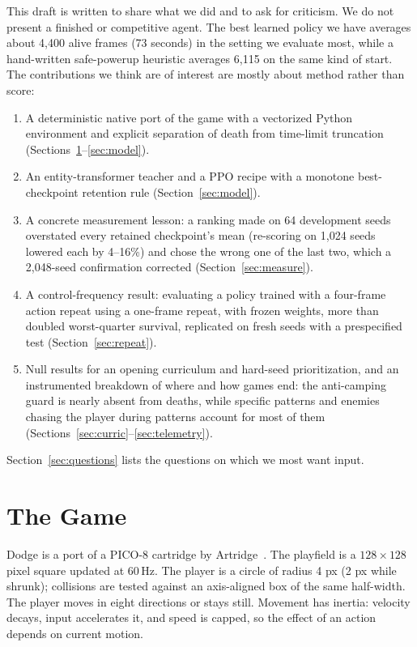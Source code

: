 \documentclass[journal]{IEEEtran}
\begin{document}
This draft is written to share what we did and to ask for criticism. We do not present a finished or competitive agent. The best learned policy we have averages about 4{,}400 alive frames (73 seconds) in the setting we evaluate most, while a hand-written safe-powerup heuristic averages 6{,}115 on the same kind of start. The contributions we think are of interest are mostly about method rather than score:
\begin{enumerate}
\item A deterministic native port of the game with a vectorized Python environment and explicit separation of death from time-limit truncation (Sections~\ref{sec:game}--\ref{sec:model}).
\item An entity-transformer teacher and a PPO recipe with a monotone best-checkpoint retention rule (Section~\ref{sec:model}).
\item A concrete measurement lesson: a ranking made on 64 development seeds overstated every retained checkpoint's mean (re-scoring on 1{,}024 seeds lowered each by 4--16\%) and chose the wrong one of the last two, which a 2{,}048-seed confirmation corrected (Section~\ref{sec:measure}).
\item A control-frequency result: evaluating a policy trained with a four-frame action repeat using a one-frame repeat, with frozen weights, more than doubled worst-quarter survival, replicated on fresh seeds with a prespecified test (Section~\ref{sec:repeat}).
\item Null results for an opening curriculum and hard-seed prioritization, and an instrumented breakdown of where and how games end: the anti-camping guard is nearly absent from deaths, while specific patterns and enemies chasing the player during patterns account for most of them (Sections~\ref{sec:curric}--\ref{sec:telemetry}).
\end{enumerate}
Section~\ref{sec:questions} lists the questions on which we most want input.

\section{The Game}\label{sec:game}
Dodge is a port of a PICO-8 cartridge by Artridge~\cite{artridge}. The playfield is a $128\times128$ pixel square updated at 60\,Hz. The player is a circle of radius 4 px (2 px while shrunk); collisions are tested against an axis-aligned box of the same half-width. The player moves in eight directions or stays still. Movement has inertia: velocity decays, input accelerates it, and speed is capped, so the effect of an action depends on current motion.
\end{document}
